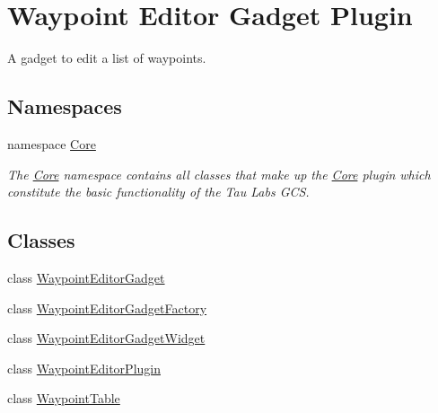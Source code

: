 \hypertarget{group___waypoint_editor_gadget_plugin}{\section{Waypoint Editor Gadget Plugin}
\label{group___waypoint_editor_gadget_plugin}
}


A gadget to edit a list of waypoints.  


\subsection*{Namespaces}
\begin{DoxyCompactItemize}
\item 
namespace \hyperlink{namespace_core}{Core}
\begin{DoxyCompactList}\small\item\em The \hyperlink{namespace_core}{Core} namespace contains all classes that make up the \hyperlink{namespace_core}{Core} plugin which constitute the basic functionality of the Tau Labs G\-C\-S. \end{DoxyCompactList}\end{DoxyCompactItemize}
\subsection*{Classes}
\begin{DoxyCompactItemize}
\item 
class \hyperlink{class_waypoint_editor_gadget}{Waypoint\-Editor\-Gadget}
\item 
class \hyperlink{class_waypoint_editor_gadget_factory}{Waypoint\-Editor\-Gadget\-Factory}
\item 
class \hyperlink{class_waypoint_editor_gadget_widget}{Waypoint\-Editor\-Gadget\-Widget}
\item 
class \hyperlink{class_waypoint_editor_plugin}{Waypoint\-Editor\-Plugin}
\item 
class \hyperlink{class_waypoint_table}{Waypoint\-Table}
\end{DoxyCompactItemize}
